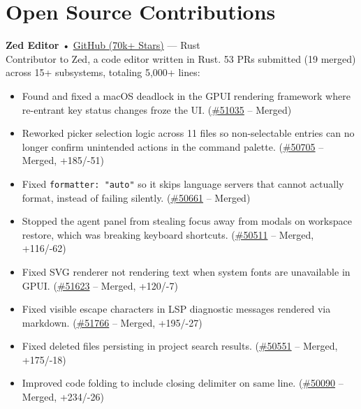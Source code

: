 \documentclass[10pt,a4paper]{article}
\begin{document}
\section{Open Source Contributions}

\vspace{2pt}
\noindent\textbf{\footnotesize Zed Editor} • {\footnotesize\href{https://github.com/zed-industries/zed}{GitHub (70k+ Stars)} — Rust}\\
{\footnotesize Contributor to Zed, a code editor written in Rust. 53 PRs submitted (19 merged) across 15+ subsystems, totaling 5,000+ lines:}
\begin{itemize}
    \item {\footnotesize Found and fixed a macOS deadlock in the GPUI rendering framework where re-entrant key status changes froze the UI. (\href{https://github.com/zed-industries/zed/pull/51035}{\#51035} -- Merged)}
    \item {\footnotesize Reworked picker selection logic across 11 files so non-selectable entries can no longer confirm unintended actions in the command palette. (\href{https://github.com/zed-industries/zed/pull/50705}{\#50705} -- Merged, +185/-51)}
    \item {\footnotesize Fixed \texttt{formatter: "auto"} so it skips language servers that cannot actually format, instead of failing silently. (\href{https://github.com/zed-industries/zed/pull/50661}{\#50661} -- Merged)}
    \item {\footnotesize Stopped the agent panel from stealing focus away from modals on workspace restore, which was breaking keyboard shortcuts. (\href{https://github.com/zed-industries/zed/pull/50511}{\#50511} -- Merged, +116/-62)}
    \item {\footnotesize Fixed SVG renderer not rendering text when system fonts are unavailable in GPUI. (\href{https://github.com/zed-industries/zed/pull/51623}{\#51623} -- Merged, +120/-7)}
    \item {\footnotesize Fixed visible escape characters in LSP diagnostic messages rendered via markdown. (\href{https://github.com/zed-industries/zed/pull/51766}{\#51766} -- Merged, +195/-27)}
    \item {\footnotesize Fixed deleted files persisting in project search results. (\href{https://github.com/zed-industries/zed/pull/50551}{\#50551} -- Merged, +175/-18)}
    \item {\footnotesize Improved code folding to include closing delimiter on same line. (\href{https://github.com/zed-industries/zed/pull/50090}{\#50090} -- Merged, +234/-26)}

\end{itemize}
\end{document}
